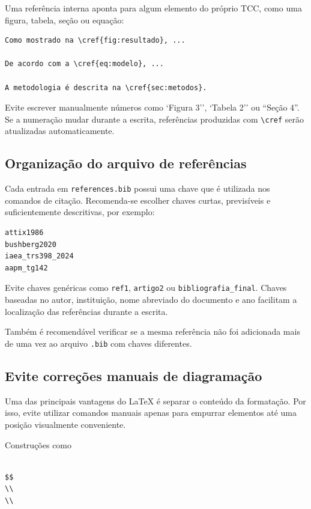 Uma referência interna aponta para algum elemento do próprio TCC, como uma figura, tabela, seção ou equação:

\begin{verbatim}
Como mostrado na \cref{fig:resultado}, ...

De acordo com a \cref{eq:modelo}, ...

A metodologia é descrita na \cref{sec:metodos}.
\end{verbatim}

Evite escrever manualmente números como `Figura 3'', `Tabela 2'' ou ``Seção 4''. Se a numeração mudar durante a escrita, referências produzidas com \verb|\cref| serão atualizadas automaticamente.

\subsection{Organização do arquivo de referências}
\label{ssec:organizacao_bib}

Cada entrada em \verb|references.bib| possui uma chave que é utilizada nos comandos de citação. Recomenda-se escolher chaves curtas, previsíveis e suficientemente descritivas, por exemplo:

\begin{verbatim}
attix1986
bushberg2020
iaea_trs398_2024
aapm_tg142
\end{verbatim}

Evite chaves genéricas como \verb|ref1|, \verb|artigo2| ou \verb|bibliografia_final|. Chaves baseadas no autor, instituição, nome abreviado do documento e ano facilitam a localização das referências durante a escrita.

Também é recomendável verificar se a mesma referência não foi adicionada mais de uma vez ao arquivo \verb|.bib| com chaves diferentes.

\subsection{Evite correções manuais de diagramação}
\label{ssec:evitar_formatacao_manual}

Uma das principais vantagens do LaTeX é separar o conteúdo da formatação. Por isso, evite utilizar comandos manuais apenas para empurrar elementos até uma posição visualmente conveniente.

Construções como

\begin{verbatim}

$$
\\
\\
\end{verbatim}

